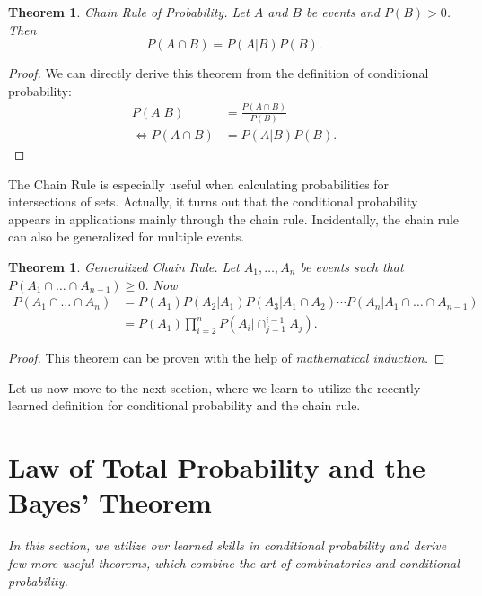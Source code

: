\documentclass[12pt,a4paper,leqno]{report}
\theoremstyle{plain}
\newtheorem{lause}[equation]{Theorem}
\theoremstyle{definition}
\begin{document}
\begin{lause}
\label{lause:chainrule}
Chain Rule of Probability. Let $A$ and $B$ be events and $P(B) > 0$. Then
\[
P(A\cap B) = P(A|B)P(B). 
\] 
\end{lause}

\begin{proof}
We can directly derive this theorem from the definition of conditional probability:
\[
\begin{split}
P(A|B) &=  \frac{P(A \cap B)}{P(B)} \\
\Leftrightarrow P(A\cap B) &= P(A|B)P(B).
\end{split}
\]
\end{proof}

The Chain Rule is especially useful when calculating probabilities for intersections of sets. Actually, it turns out that the conditional probability appears in applications mainly through the chain rule. Incidentally, the chain rule can also be generalized for multiple events.

\begin{lause}\label{lause:chainrule_multiple}
Generalized Chain Rule. Let $A_1, \dots , A_n$ be events such that $P(A_1 \cap \dots \cap A_{n-1}) \geq 0$. Now 
\[
\begin{split}
P(A_1 \cap \dots \cap A_n) &= P(A_1) P(A_2 | A_1) P(A_3 | A_1 \cap A_2 ) \cdots P(A_n | A_1 \cap \dots \cap A_{n-1}) \\
&= P(A_1)\prod_{i=2}^n P(A_i | \cap_{j=1}^{i-1} A_j). 
\end{split}
\] 
\end{lause}

\begin{proof}
This theorem can be proven with the help of \emph{mathematical induction.}
\end{proof}

Let us now move to the next section, where we learn to utilize the recently learned definition for conditional probability and the chain rule.

\section{Law of Total Probability and the Bayes' Theorem}

\emph{In this section, we utilize our learned skills in conditional probability and derive few more useful theorems, which combine the art of combinatorics and conditional probability.}
\end{document}
